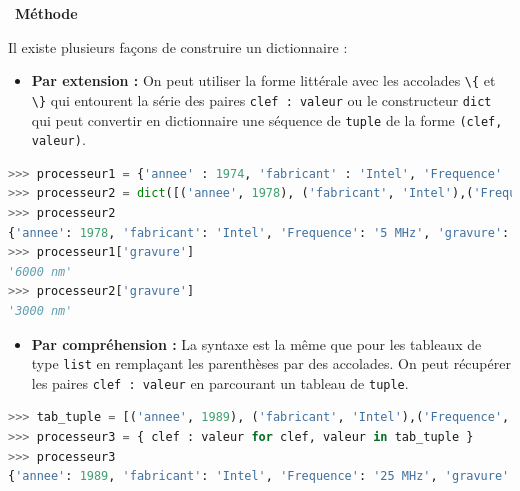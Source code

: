 \documentclass[
  11pt,
]{article}
\newcommand{\passthrough}[1]{#1}
\providecommand{\tightlist}{%
  \setlength{\itemsep}{0pt}\setlength{\parskip}{0pt}}
\newenvironment{methode}[1]
{\par \medskip    \noindent  
 \begin {bclogo}[arrondi =0.1,logo=\bcoutil, marge=4,noborder = true] {~\textbf{Méthode}   {\itshape #1} }  \par}
{
\end{bclogo}
 \par \bigskip }
\begin{document}
\begin{methode}{}

Il existe plusieurs façons de construire un dictionnaire :

\begin{itemize}
\tightlist
\item
  \textbf{Par extension :} On peut utiliser la forme littérale avec les
  accolades \passthrough{\lstinline!\{!} et \passthrough{\lstinline!\}!}
  qui entourent la série des paires
  \passthrough{\lstinline!clef : valeur!} ou le constructeur
  \passthrough{\lstinline!dict!} qui peut convertir en dictionnaire une
  séquence de \passthrough{\lstinline!tuple!} de la forme
  \passthrough{\lstinline!(clef, valeur)!}.
\end{itemize}

\begin{lstlisting}[language=Python]
>>> processeur1 = {'annee' : 1974, 'fabricant' : 'Intel', 'Frequence' : '2 MHz','gravure' : '6000 nm', 'architecture' : '8080'}
>>> processeur2 = dict([('annee', 1978), ('fabricant', 'Intel'),('Frequence','5 MHz'),('gravure','3 micrometres'),('architecture','8086')])
>>> processeur2
{'annee': 1978, 'fabricant': 'Intel', 'Frequence': '5 MHz', 'gravure': '3000 nm', 'architecture': '8086'}
>>> processeur1['gravure']
'6000 nm'
>>> processeur2['gravure']
'3000 nm'
\end{lstlisting}

\begin{itemize}
\tightlist
\item
  \textbf{Par compréhension :} La syntaxe est la même que pour les
  tableaux de type \passthrough{\lstinline!list!} en remplaçant les
  parenthèses par des accolades. On peut récupérer les paires
  \passthrough{\lstinline!clef : valeur!} en parcourant un tableau de
  \passthrough{\lstinline!tuple!}.
\end{itemize}

\begin{lstlisting}[language=Python]
>>> tab_tuple = [('annee', 1989), ('fabricant', 'Intel'),('Frequence','25 MHz'),('gravure','600 nm'),('architecture','80486')]
>>> processeur3 = { clef : valeur for clef, valeur in tab_tuple }
>>> processeur3
{'annee': 1989, 'fabricant': 'Intel', 'Frequence': '25 MHz', 'gravure': '600 nm', 'architecture': '80486'}
\end{lstlisting}

\end{methode}
\end{document}
